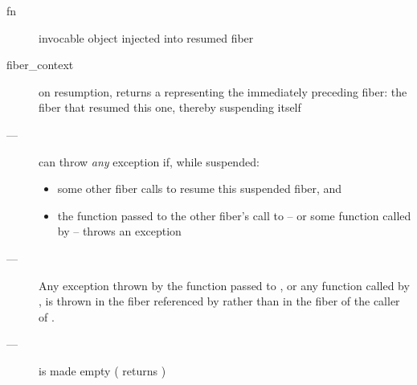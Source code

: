 \params
\begin{description}
    \item[fn] invocable object injected into resumed fiber
\end{description}

\returns
\begin{description}
    \item[fiber\_context] on resumption, \xtresumewith returns a \fiber
               representing the immediately preceding fiber: the fiber that
               resumed this one, thereby suspending itself
\end{description}

\except
\begin{description}
    \item[---] \xtresumewith can
              throw \emph{any} exception if, while suspended:
              \begin{itemize}
                  \item some other fiber calls \someresumewith to
                        resume this suspended fiber, and
                  \item the function  passed to the other
                        fiber's call to \someresumewith
                        -- or some function called
                        by  -- throws an exception
              \end{itemize}
    \item[---] Any exception thrown by the function  passed
              to \xtresumewith, or any function called
              by , is thrown in the fiber referenced by 
              rather than in the fiber of the caller of \xtresumewith.
\end{description}

\postcond
\begin{description}
    \item[---]  is made empty ( returns )
\end{description}


